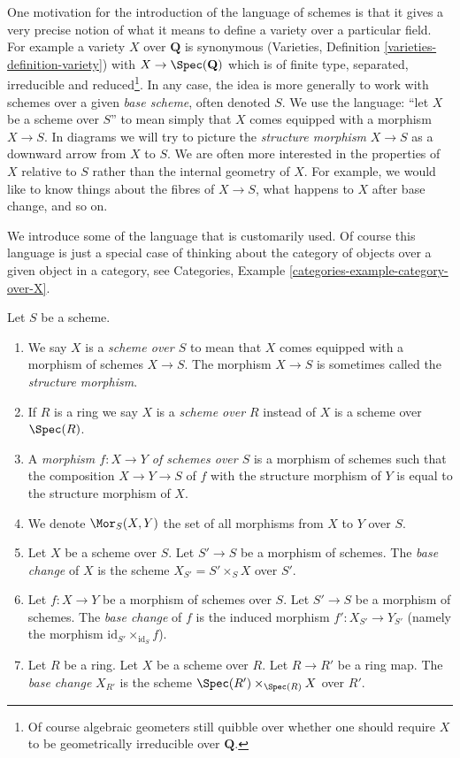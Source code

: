 \noindent
One motivation for the introduction of the language of schemes
is that it gives a very precise notion of what it means to
define a variety over a particular field. For example a variety
$X$ over $\mathbf{Q}$ is synonymous
(Varieties, Definition \ref{varieties-definition-variety})
with $X \to \Spec(\mathbf{Q})$ which is of finite type,
separated, irreducible and reduced\footnote{Of course algebraic
geometers still quibble over whether one should require $X$ to be
geometrically irreducible over $\mathbf{Q}$.}. In any case, the idea
is more generally to work with schemes over a given {\it base scheme},
often denoted $S$. We use the language: ``let $X$ be a scheme over $S$''
to mean simply that $X$ comes equipped with a morphism $X \to S$.
In diagrams we will try to picture the {\it structure morphism}
$X \to S$ as a downward arrow from $X$ to $S$.
We are often more interested in the properties of $X$ relative
to $S$ rather than the internal geometry of $X$.
For example, we would like to know things about the fibres of $X \to S$,
what happens to $X$ after base change, and so on.

\medskip\noindent
We introduce some of the language that is customarily used.
Of course this language is just a special case of thinking
about the category of objects over a given object in a category,
see Categories, Example \ref{categories-example-category-over-X}.

\begin{definition}
\label{definition-base-change}
Let $S$ be a scheme.
\begin{enumerate}
\item We say $X$ is a {\it scheme over $S$} to mean that $X$
comes equipped with a morphism of schemes $X \to S$.
The morphism $X \to S$ is sometimes called the
{\it structure morphism}.
\item If $R$ is a ring we say
$X$ is a {\it scheme over $R$} instead of
$X$ is a scheme over $\Spec(R)$.
\item A {\it morphism $f : X \to Y$ of schemes over $S$}
is a morphism of schemes such that the composition
$X \to Y \to S$ of $f$ with the structure morphism of $Y$ is
equal to the structure morphism of $X$.
\item We denote $\Mor_S(X, Y)$ the set of all morphisms
from $X$ to $Y$ over $S$.
\item Let $X$ be a scheme over $S$. Let $S' \to S$ be a
morphism of schemes. The {\it base change} of $X$
is the scheme $X_{S'} = S' \times_S X$ over $S'$.
\item Let $f : X \to Y$ be a morphism of schemes over $S$. Let $S' \to S$
be a morphism of schemes. The {\it base change} of $f$ is
the induced morphism $f' : X_{S'} \to Y_{S'}$ (namely the
morphism $\text{id}_{S'} \times_{\text{id}_S} f$).
\item Let $R$ be a ring. Let $X$ be a scheme over $R$.
Let $R \to R'$ be a ring map. The {\it base change} $X_{R'}$
is the scheme $\Spec(R') \times_{\Spec(R)} X$
over $R'$.
\end{enumerate}
\end{definition}

